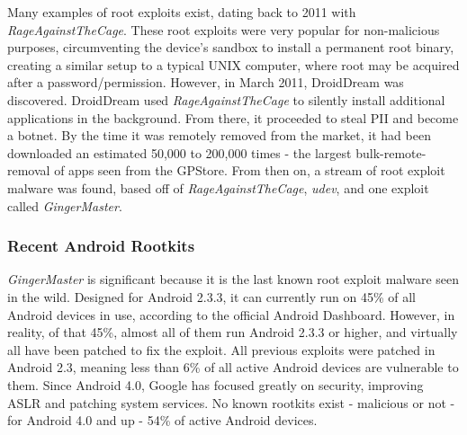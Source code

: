 Many examples of root exploits exist, dating back to 2011 with \textit{RageAgainstTheCage}\citep{droiddream}. These root exploits were very popular for non-malicious purposes, circumventing the device's sandbox to install a permanent root binary, creating a similar setup to a typical UNIX computer, where root may be acquired after a password/permission. However, in March 2011, DroidDream was discovered. DroidDream used \textit{RageAgainstTheCage} to silently install additional applications in the background. From there, it proceeded to steal PII and become a botnet. By the time it was remotely removed from the market, it had been downloaded an estimated 50,000 to 200,000 times\citep{castillo2010android} - the largest bulk-remote-removal of apps seen from the GPStore. From then on, a stream of root exploit malware was found, based off of \textit{RageAgainstTheCage}, \textit{udev}, and one exploit called \textit{GingerMaster}\citep{gingermaster}.

\subsubsection{Recent Android Rootkits}
\label{sec:recentrootkits}
\textit{GingerMaster} is significant because it is the last known root exploit malware seen in the wild. Designed for Android 2.3.3, it can currently run on 45\% of all Android devices in use, according to the official Android Dashboard\citep{androiddashboard}. However, in reality, of that 45\%, almost all of them run Android 2.3.3 or higher, and virtually all have been patched to fix the exploit. All previous exploits were patched in Android 2.3, meaning less than 6\% of all active Android devices are vulnerable to them. Since Android 4.0, Google has focused greatly on security, improving ASLR and patching system services. No known rootkits exist - malicious or not - for Android 4.0 and up - 54\% of active Android devices.


